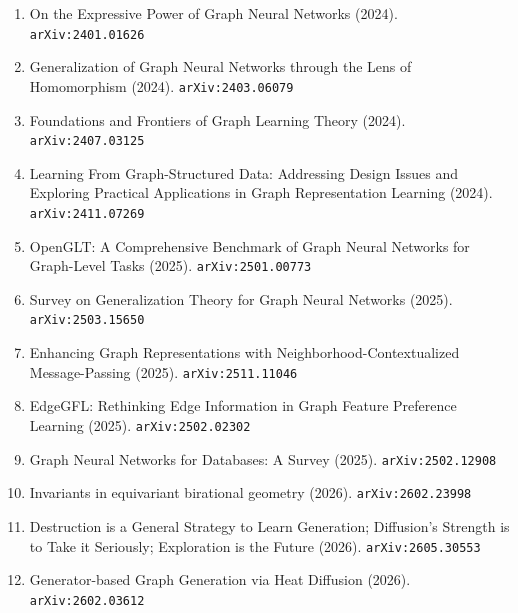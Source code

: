 \documentclass[11pt]{article}
\begin{document}
\begin{enumerate}
  \item On the Expressive Power of Graph Neural Networks (2024). \texttt{arXiv:2401.01626}
  \item Generalization of Graph Neural Networks through the Lens of Homomorphism (2024). \texttt{arXiv:2403.06079}
  \item Foundations and Frontiers of Graph Learning Theory (2024). \texttt{arXiv:2407.03125}
  \item Learning From Graph-Structured Data: Addressing Design Issues and
  Exploring Practical Applications in Graph Representation Learning (2024). \texttt{arXiv:2411.07269}
  \item OpenGLT: A Comprehensive Benchmark of Graph Neural Networks for Graph-Level Tasks (2025). \texttt{arXiv:2501.00773}
  \item Survey on Generalization Theory for Graph Neural Networks (2025). \texttt{arXiv:2503.15650}
  \item Enhancing Graph Representations with Neighborhood-Contextualized Message-Passing (2025). \texttt{arXiv:2511.11046}
  \item EdgeGFL: Rethinking Edge Information in Graph Feature Preference
  Learning (2025). \texttt{arXiv:2502.02302}
  \item Graph Neural Networks for Databases: A Survey (2025). \texttt{arXiv:2502.12908}
  \item Invariants in equivariant birational geometry (2026). \texttt{arXiv:2602.23998}
  \item Destruction is a General Strategy to Learn Generation; Diffusion's Strength is to Take it Seriously; Exploration is the Future (2026). \texttt{arXiv:2605.30553}
  \item Generator-based Graph Generation via Heat Diffusion (2026). \texttt{arXiv:2602.03612}
\end{enumerate}
\end{document}
